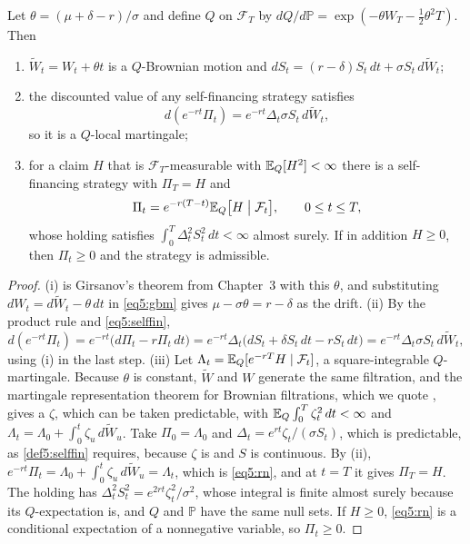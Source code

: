 \begin{chapterrefs}
\begin{theorem}\label{thm5:rn}
Let $\theta=(\mu+\delta-r)/\sigma$ and define $Q$ on $\mathcal F_T$ by $dQ/d\mathbb P=\exp(-\theta W_T-\tfrac12\theta^2T)$.
Then
\begin{enumerate}[label=(\roman*)]
  \item $\widetilde W_t=W_t+\theta t$ is a $Q$-Brownian motion and
  $dS_t=(r-\delta)S_t\,dt+\sigma S_t\,d\widetilde W_t$;
  \item the discounted value of any self-financing strategy satisfies
  \begin{equation*}
    d(e^{-rt}\Pi_t)=e^{-rt}\Delta_t\sigma S_t\,d\widetilde W_t ,
  \end{equation*}
  so it is a $Q$-local martingale;
  \item for a claim $H$ that is $\mathcal F_T$-measurable with $\mathbb{E}_Q[H^2]<\infty$ there is a
  self-financing strategy with $\Pi_T=H$ and
  \begin{equation}\label{eq5:rn}
    \Pi_t=e^{-r(T-t)}\mathbb{E}_Q\bigl[H\bigm|\mathcal F_t\bigr],\qquad 0\le t\le T ,
  \end{equation}
  whose holding satisfies $\int_0^T\Delta_t^2S_t^2\,dt<\infty$ almost surely. If in addition
  $H\ge0$, then $\Pi_t\ge0$ and the strategy is admissible.
\end{enumerate}
\end{theorem}

\begin{proof}
(i) is Girsanov's theorem from Chapter~3 with this $\theta$, and substituting
$dW_t=d\widetilde W_t-\theta\,dt$ in \cref{eq5:gbm} gives $\mu-\sigma\theta=r-\delta$ as the drift.
(ii) By the product rule and \cref{eq5:selffin},
\begin{equation*}
  d(e^{-rt}\Pi_t)=e^{-rt}\bigl(d\Pi_t-r\Pi_t\,dt\bigr)=e^{-rt}\Delta_t\bigl(dS_t+\delta S_t\,dt-rS_t\,dt\bigr)
  =e^{-rt}\Delta_t\sigma S_t\,d\widetilde W_t ,
\end{equation*}
using (i) in the last step. (iii) Let $\Lambda_t=\mathbb{E}_Q[e^{-rT}H\mid\mathcal F_t]$, a square-integrable
$Q$-martingale. Because $\theta$ is constant, $\widetilde W$ and $W$ generate the same filtration, and
the martingale representation theorem for Brownian filtrations, which we quote
\parencite[Theorem 5.3.1]{shreve2004}, gives a $\zeta$, which can be taken predictable, with $\mathbb{E}_Q\int_0^T\zeta_t^2\,dt<\infty$
and $\Lambda_t=\Lambda_0+\int_0^t\zeta_u\,d\widetilde W_u$. Take $\Pi_0=\Lambda_0$ and $\Delta_t=e^{rt}\zeta_t/(\sigma S_t)$,
which is predictable, as \cref{def5:selffin} requires, because $\zeta$ is and $S$ is continuous.
By (ii), $e^{-rt}\Pi_t=\Lambda_0+\int_0^t\zeta_u\,d\widetilde W_u=\Lambda_t$, which is \cref{eq5:rn}, and at
$t=T$ it gives $\Pi_T=H$. The holding has $\Delta_t^2S_t^2=e^{2rt}\zeta_t^2/\sigma^2$, whose integral is
finite almost surely because its $Q$-expectation is, and $Q$ and $\mathbb P$ have the same null sets.
If $H\ge0$, \cref{eq5:rn} is a conditional expectation of a nonnegative variable, so $\Pi_t\ge0$.
\end{proof}


\end{chapterrefs}
